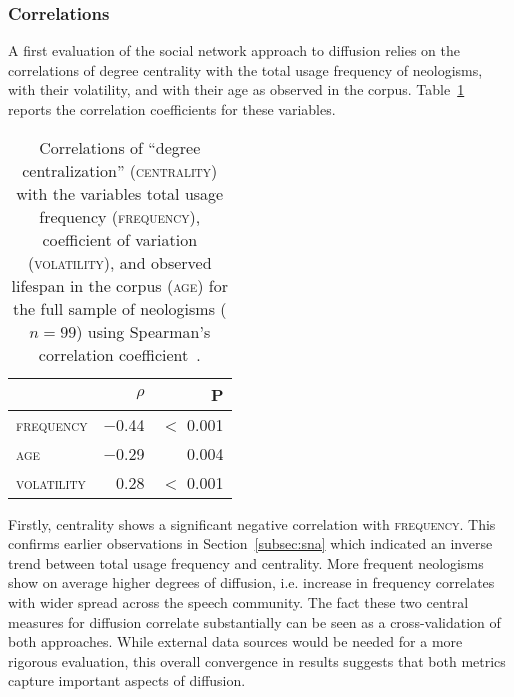 \documentclass[
  a4paper,
  abstract=on,
  captions=tableabove,
  ]{scrartcl}
\begin{document}
    \subsubsection{Correlations}

      A first evaluation of the social network approach to diffusion relies on the correlations of degree centrality with the total usage frequency of neologisms, with their volatility, and with their age as observed in the corpus. Table~\ref{tab:correlations} reports the correlation coefficients for these variables.

      \begin{table}
        \centering
        \caption[Correlation matrix for \textsc{centrality}]{Correlations of \enquote{degree centralization} (\textsc{centrality}) with the variables total usage frequency (\textsc{frequency}), coefficient of variation (\textsc{volatility}), and observed lifespan in the corpus (\textsc{age}) for the full sample of neologisms ($n=99$) using Spearman's correlation coefficient~\parencite{Spearman1961ProofMeasurement}.\protect\footnotemark{}}
        \label{tab:correlations}
        \begin{tabular}{>{\scshape}l r r}
          \toprule
                      & {$\rho$}    & P               \\
          \midrule
          frequency  & \num{-0.44} & $<$ \num{0.001} \\
          age        & \num{-0.29} & \num{0.004}     \\
          volatility & \num{0.28}  & $<$ \num{0.001} \\
          \bottomrule
        \end{tabular}
      \end{table}

      Firstly, centrality shows a significant negative correlation with \textsc{frequency}. This confirms earlier observations in Section~\ref{subsec:sna} which indicated an inverse trend between total usage frequency and centrality. More frequent neologisms show on average higher degrees of diffusion, i.e. increase in frequency correlates with wider spread across the speech community. The fact these two central measures for diffusion correlate substantially can be seen as a cross-validation of both approaches. While external data sources would be needed for a more rigorous evaluation, this overall convergence in results suggests that both metrics capture important aspects of diffusion.
\end{document}
